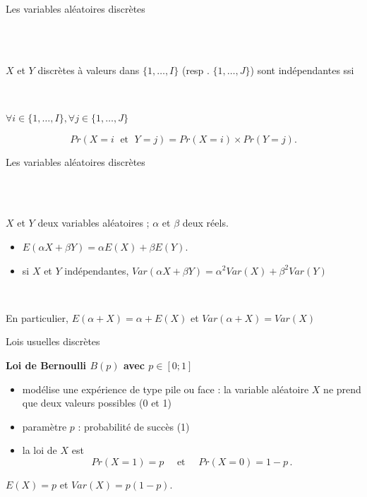 \documentclass{beamer}
\begin{document}

\begin{frame}{Les variables aléatoires  discrètes}

\\

\

 $X$ et $Y$ discrètes à valeurs  dans $\{1,\ldots,I\}$
(resp . $\{1,\ldots,J\}$) sont indépendantes ssi 

\

$\forall i \in \{1,\ldots,I\} , \forall j \in \{1,\ldots,J\}$

$$Pr(X=i\;{\mbox { et }}\; Y=j)=Pr(X=i)\times Pr(Y=j).$$


\end{frame}


\begin{frame}{Les variables aléatoires discrètes}

 \\

\

$X$ et $Y$ deux variables aléatoires ;
$\alpha$ et $\beta$ deux réels.
\begin{itemize}
\item $E(\alpha X+\beta Y) =  \alpha E(X) + \beta E(Y)$.
\item si $X$ et $Y$ indépendantes, $Var(\alpha X+\beta Y) = \alpha^2 Var(X) + \beta^2 Var(Y)$ 
\end{itemize}

\

En particulier,  
$E(\alpha+ X) =  \alpha +E(X) $ et $Var(\alpha + X) =  Var(X) $ 

\end{frame}


\begin{frame}{Lois usuelles discrètes}

\begin{center}{\bf \Large Loi de Bernoulli $B(p)$ avec $p\in[0;1]$} \end{center}
\begin{itemize}
\item  modélise une expérience de type pile ou face :
 la variable aléatoire $X$ ne prend que deux valeurs possibles (0 et 1)
 \item  paramètre $p$ : probabilité de succès (1)
 \item  la loi de $X$ est
$$
Pr(X=1)=p\quad {\mbox { et }} \quad Pr(X=0)=1-p\,.
$$


\end{itemize}
$E(X)=p$ et $Var(X)=p(1-p)$.


\end{frame}
\end{document}
